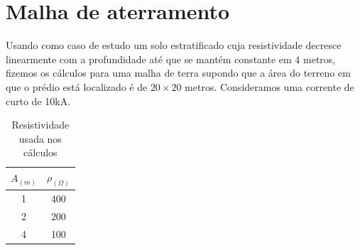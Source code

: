 \documentclass[a4paper,12pt]{report}
\begin{document}
\chapter*{Malha de aterramento}

Usando como caso de estudo um solo estratificado cuja resistividade decresce linearmente com a profundidade até que se mantém constante em 4 metros, fizemos os cálculos para uma malha de terra supondo que a área do terreno em que o prédio está localizado é de $20\times20$ metros. Consideramos uma corrente de curto de 10kA.

\begin{table}[htbp]
  \centering

    \begin{tabular}{cc}
    \toprule
    \textbf{$A_{(m)}$} & \textbf{$\rho_{(\Omega)}$}\\
    \midrule
    1     & 400 \\ 
    2     & 200 \\
    4     & 100 \\
    \bottomrule
    \end{tabular}%
  \caption{Resistividade usada nos cálculos}
\end{table}
\end{document}
